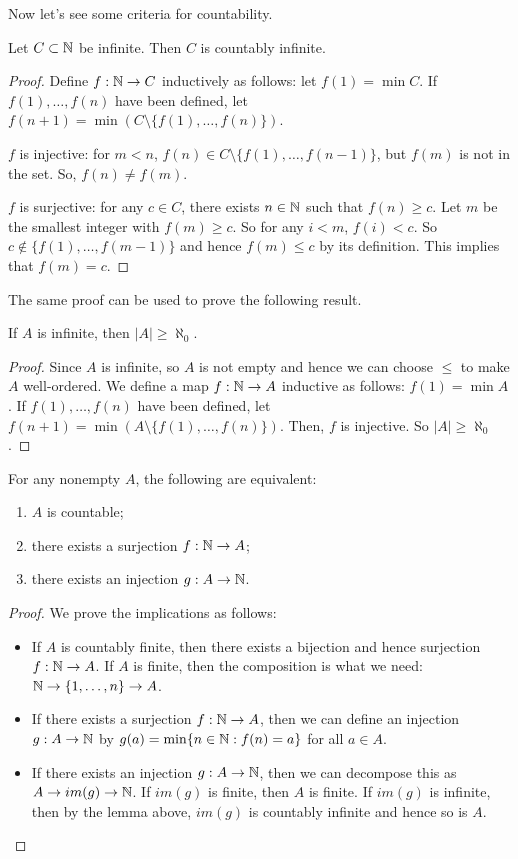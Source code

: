 Now let's see some criteria for countability.

\begin{lemma}
  Let $C\subset\mathbb{N}$ be infinite. Then $C$ is countably infinite.
\end{lemma}
\begin{proof}
  Define $f:\mathbb{N}\to C$ inductively as follows: let $f(1)=\min C$. If $f(1),\ldots,f(n)$ have been defined, let $f(n+1)=\min(C\setminus\{f(1),\ldots,f(n)\})$. 

  $f$ is injective: for $m<n$, $f(n)\in C\setminus\{f(1),\ldots,f(n-1)\}$, but $f(m)$ is not in the set. So, $f(n)\neq f(m)$.

  $f$ is surjective: for any $c\in C$, there exists $n\in\mathbb{N}$ such that $f(n)\geq c$. Let $m$ be the smallest integer with $f(m)\geq c$. So for any $i<m$, $f(i)<c$. So $c\notin\{f(1),\ldots,f(m-1)\}$ and hence $f(m)\leq c$ by its definition. This implies that $f(m)=c$.
\end{proof}

The same proof can be used to prove the following result.

\begin{proposition}
If $A$ is infinite, then $|A|\ge \aleph_0$.
\end{proposition}
\begin{proof}
  Since $A$ is infinite, so $A$ is not empty and hence we can choose $\leq$ to make $A$ well-ordered. We define a map $f:\mathbb{N}\to A$ inductive as follows: $f(1)=\min A$. If $f(1),\ldots,f(n)$ have been defined, let $f(n+1)=\min(A\setminus\{f(1),\ldots,f(n)\})$. Then, $f$ is injective. So $|A|\geq \aleph_0$.
\end{proof}

\begin{theorem}
  For any nonempty $A$, the following are equivalent:
  \begin{enumerate}
    \item $A$ is countable;
    \item there exists a surjection $f:\mathbb{N}\to A$;
    \item there exists an injection $g:A\to\mathbb{N}$.
  \end{enumerate}
\end{theorem}
\begin{proof}
  We prove the implications as follows:
  \begin{itemize}
    \item[$(1)\Rightarrow(2)$] If $A$ is countably finite, then there exists a bijection and hence surjection $f:\mathbb{N}\to A$. If $A$ is finite, then the composition is what we need: $\mathbb{N}\to \{1,\ldots,n\}\to A$.
    \item[$(2)\Rightarrow(3)$] If there exists a surjection $f:\mathbb{N}\to A$, then we can define an injection $g:A\to\mathbb{N}$ by $g(a)=\min\{n\in\mathbb{N}:f(n)=a\}$ for all $a\in A$.
    \item[$(3)\Rightarrow(1)$] If there exists an injection $g:A\to\mathbb{N}$, then we can decompose this as $A\to im(g)\to \mathbb{N}$. If $im(g)$ is finite, then $A$ is finite. If $im(g)$ is infinite, then by the lemma above, $im(g)$ is countably infinite and hence so is $A$.
  \end{itemize}
\end{proof}


